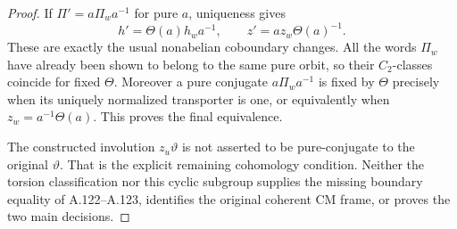 \begin{proof}
If \(\Pi'=a\Pi_wa^{-1}\) for pure \(a\), uniqueness gives
\[
 h'=\Theta(a)h_wa^{-1},\qquad
 z'=a z_w\Theta(a)^{-1}.
 \tag{A.124.14}
\]
These are exactly the usual nonabelian coboundary changes.
All the words \(\Pi_w\) have already been shown to belong to the
same pure orbit, so their \(C_2\)-classes coincide for fixed
\(\Theta\). Moreover a pure conjugate \(a\Pi_wa^{-1}\) is fixed
by \(\Theta\) precisely when its uniquely normalized transporter
is one, or equivalently when
\(z_w=a^{-1}\Theta(a)\). This proves the final equivalence.

The constructed involution \(z_u\vartheta\) is not asserted to be
pure-conjugate to the original \(\vartheta\). That is the explicit
remaining cohomology condition. Neither the torsion classification
nor this cyclic subgroup supplies the missing boundary equality of
A.122--A.123, identifies the original coherent CM frame, or proves
the two main decisions.
\end{proof}
